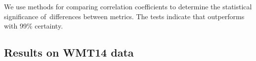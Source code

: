 We use methods for comparing correlation coefficients \cite{meng1992comparing} to determine the statistical significance of~differences between metrics. The tests indicate that \parmesan outperforms \mn with 99\% certainty. 


\subsection{Results on WMT14 data}
\label{vysledky}

